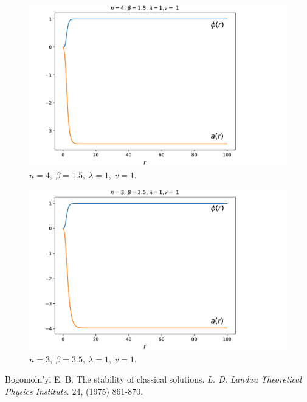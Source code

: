 \documentclass[12pt,a4paper]{article}
\begin{document}
\begin{figure}
\includegraphics[scale=0.8]{n4b15l1v1.pdf}
\caption{$n=4,\ \beta = 1.5,\ \lambda = 1,\ v = 1$.}
\label{fig:a}
\end{figure}

\begin{figure}
\includegraphics[scale=0.8]{n3b35l1v1.pdf}
\caption{$n=3,\ \beta = 3.5,\ \lambda = 1,\ v = 1$.}
\label{fig:b}
\end{figure}


\begin{thebibliography}{9}
 Bogomoln'yi E. B. The stability of classical solutions. \emph{L. D. Landau Theoretical Physics Institute}. 24, (1975) 861-870.

\end{thebibliography}
\end{document}
